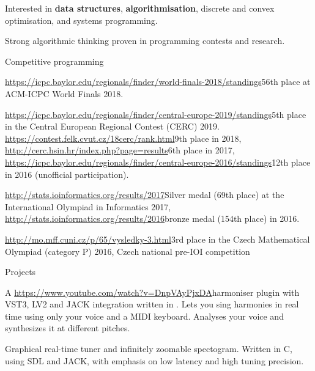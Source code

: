 Interested in {\bf data structures}, {\bf algorithmisation}, discrete and convex
optimisation, and systems programming.

Strong algorithmic thinking proven in programming contests and research.

\sekce Competitive programming

\url{https://icpc.baylor.edu/regionals/finder/world-finals-2018/standings}{56th
place} at ACM-ICPC World Finals 2018.

\url{https://icpc.baylor.edu/regionals/finder/central-europe-2019/standings}{5th place} in the Central
European Regional Contest (CERC) 2019.
\url{https://contest.felk.cvut.cz/18cerc/rank.html}{9th place} in 2018,
\url{http://cerc.hsin.hr/index.php?page=results}{6th place} in 2017,
\url{https://icpc.baylor.edu/regionals/finder/central-europe-2016/standings}{12th
place} in 2016 (unofficial participation).

\url{http://stats.ioinformatics.org/results/2017}{Silver medal (69th place)} at
the International Olympiad in Informatics 2017,
\url{http://stats.ioinformatics.org/results/2016}{bronze medal (154th place)}
in 2016.

\url{http://mo.mff.cuni.cz/p/65/vysledky-3.html}{3rd place} in the Czech
Mathematical Olympiad (category P) 2016, Czech national pre-IOI competition

\sekce Projects


A \url{https://www.youtube.com/watch?v=DnpVAyPjxDA}{harmoniser} plugin with
VST3, LV2 and JACK integration written in \Cpp. Lets you sing harmonies in
real time using only your voice and a MIDI keyboard. Analyses your voice and
synthesizes it at different pitches.


Graphical real-time tuner and infinitely zoomable spectogram.
Written in C, using SDL and JACK, with emphasis on low latency and high
tuning precision.

% 


